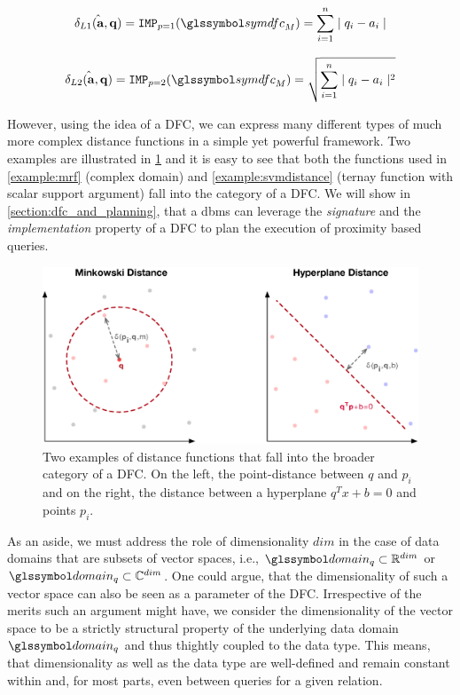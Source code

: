 \begin{equation}
    \hat{\delta_{L1}(\mathbf{a},\mathbf{q})} = \texttt{IMP}_{p=1}(\symdfc_M) = \sum_{i=1}^{n} \mid q_i - a_i \mid
\end{equation}

\begin{equation}
    \hat{\delta_{L2}(\mathbf{a},\mathbf{q})} = \texttt{IMP}_{p=2}(\symdfc_M) = \sqrt{\sum_{i=1}^{n} \mid q_i - a_i \mid^2}
\end{equation}

However, using the idea of a DFC, we can express many different types of much more complex distance functions in a simple yet powerful framework. Two examples are illustrated in \cref{figure:distance_computation} and it is easy to see that both the functions used in \cref{example:mrf} (complex domain) and \cref{example:svmdistance} (ternay function with scalar support argument) fall into the category of a DFC. We will show in \cref{section:dfc_and_planning}, that a \acrshort{dbms} can leverage the \emph{signature} and the \emph{implementation} property of a DFC to plan the execution of proximity based queries.

\begin{figure}[bt]
    \centering
    \includegraphics[width=\textwidth]{figures/distance_computations.eps}
    \caption{Two examples of distance functions that fall into the broader category of a DFC. On the left, the point-distance between $q$ and $p_i$ and on the right, the distance between a hyperplane $q^Tx+b = 0$ and points $p_i$.}
    \label{figure:distance_computation}
\end{figure}

As an aside, we must address the role of dimensionality $dim$ in the case of data domains that are subsets of vector spaces, i.e.,  $\domain_q \subset \mathbb{R}^{dim}$ or $\domain_q \subset \mathbb{C}^{dim}$. One could argue, that the dimensionality of such a vector space can also be seen as a parameter of the DFC. Irrespective of the merits such an argument might have, we consider the dimensionality of the vector space to be a strictly structural property of the underlying data domain $\domain_q$ and thus thightly coupled to the data type. This means, that dimensionality as well as the data type are well-defined and remain constant within and, for most parts, even between queries for a given relation.


